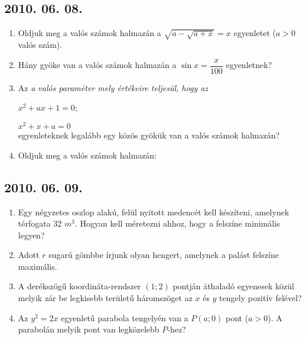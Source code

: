 \subsection*{2010. 06. 08.}
\begin{enumerate}

\item Oldjuk meg a valós számok halmazán a $\sqrt{a-\sqrt{a+x}}=x$ egyenletet ($a > 0$ valós szám).

\item Hány gyöke van a valós számok halmazán a $\sin{x}= \dfrac{x}{100}$ egyenletnek?

\item Az \it a \rm valós paraméter mely értékeire teljesül, hogy az 

$x^2+ax+1=0$;

$x^2+x+a=0$ \\ egyenleteknek legalább egy közös gyökük van a valós számok halmazán?

\item Oldjuk meg a valós számok halmazán: 

\end{enumerate}
\subsection*{2010. 06. 09.}
\begin{enumerate}

\item Egy négyzetes oszlop alakú, felül nyitott medencét kell készíteni, amelynek térfogata 32 $m^3$. Hogyan kell méretezni ahhoz, hogy a felszíne minimális legyen?

\item Adott $r$ sugarú gömbbe írjunk olyan hengert, amelynek a palást felszíne maximális.

\item A derékszögű koordináta-rendszer $(1; 2)$ pontján áthaladó egyenesek közül melyik zár be legkisebb területű háromszöget az $x$ és $y$ tengely pozitív felével? 

\item Az $y^2=2x$ egyenletű parabola tengelyén van a $P(a; 0)$ pont ($a > 0$). A parabolán melyik pont van legközelebb $P$-hez?
\end{enumerate}


